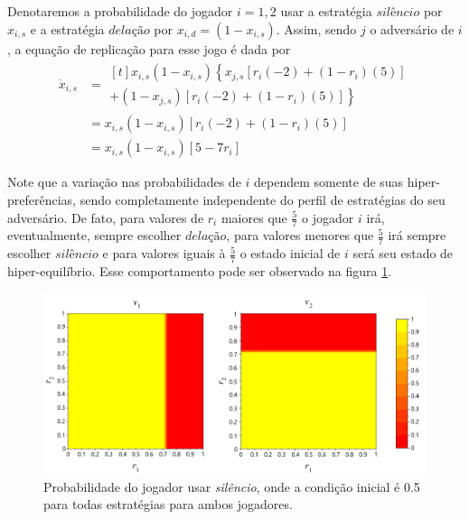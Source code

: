 Denotaremos a probabilidade do jogador $i=1,2$ usar a estratégia $\textit{silêncio}$ por $x_{i,s}$ e a estratégia $\textit{delação}$ por $x_{i,d}=(1-x_{i,s})$. Assim, sendo $j$ o adversário de $i$, a equação de replicação para esse jogo é dada por
\begin{equation}
\begin{split}
    \label{eqRepPDHREx}
    \dot{x}_{i,s}&= \!\begin{multlined}[t]
    x_{i,s}(1-x_{i,s})\left\{x_{j,s}\left[r_i(-2)+(1-r_i)(5)\right]\right.\\
    + \left. (1-x_{j,s})\left[r_i(-2)+(1-r_i)(5)\right] \right\}
    \end{multlined} \\
    &= x_{i,s}(1-x_{i,s})\left[ r_i(-2)+(1-r_i)(5) \right] \\
    &= x_{i,s}(1-x_{i,s})\left[ 5-7r_i \right]
\end{split}
\end{equation}

Note que a variação nas probabilidades de $i$ dependem somente de suas hiper-preferências, sendo completamente independente do perfil de estratégias do seu adversário. De fato, para valores de $r_i$ maiores que $\frac{5}{7}$ o jogador $i$ irá, eventualmente, sempre escolher $\textit{delação}$, para valores menores que $\frac{5}{7}$ irá sempre escolher $\textit{silêncio}$ e para valores iguais à $\frac{5}{7}$ o estado inicial de $i$ será seu estado de hiper-equilíbrio. Esse comportamento pode ser observado na figura \ref{fig:pd-neg-payoff}.

\begin{figure}[h]
    \caption{Probabilidade do jogador usar \textit{silêncio}, onde a condição inicial é 0.5 para todas estratégias para ambos jogadores.}
    \centerline{\includegraphics[scale=0.43]{./img/PD-neg-payoff.png}}
    \label{fig:pd-neg-payoff}
\end{figure}

